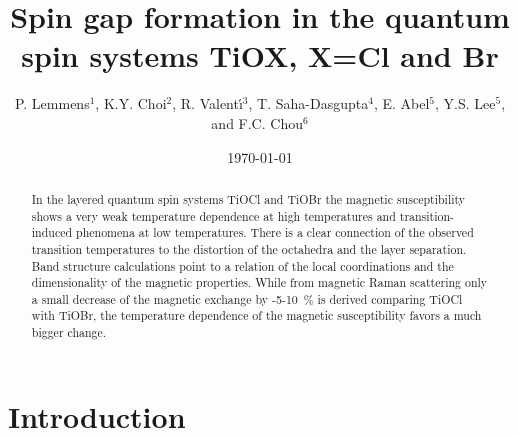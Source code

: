 \documentclass[prb,preprint,draft,amsmath,showpacs]{revtex4}
\begin{document}
\title {Spin gap formation in the quantum spin systems TiOX, X=Cl and Br}

\author {P. Lemmens$^1$, K.Y. Choi$^{2}$, R. Valent\'\i$^{3}$, T.
Saha-Dasgupta$^{4}$, E. Abel$^5$, Y.S. Lee$^5$, and F.C. Chou$^6$}







\date{\today}

\begin{abstract}
In the layered quantum spin systems TiOCl and TiOBr the magnetic susceptibility shows a
very weak temperature dependence at high temperatures and transition-induced phenomena
at low temperatures. There is a clear connection of the observed transition temperatures
to the distortion of the octahedra and the layer separation. Band structure calculations
point to a relation of the local coordinations and the dimensionality of the magnetic
properties. While from magnetic Raman scattering only a small decrease of the magnetic
exchange by -5-10~\% is derived comparing TiOCl with TiOBr, the temperature dependence
of the magnetic susceptibility favors a much bigger change.
\end{abstract}
 \maketitle

\section{Introduction}
\end{document}
